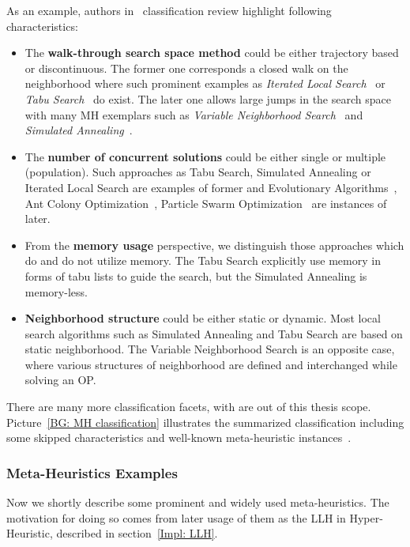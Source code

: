 As an example, authors in~\cite{birattari2001classification} classification review highlight following characteristics:
\begin{itemize}[itemsep=8pt]
	\item The \textbf{walk-through search space method} could be either trajectory based or discontinuous. The former one corresponds a closed walk on the neighborhood where such prominent examples as \textit{Iterated Local Search}~\cite{lourencco2003iterated} or \textit{Tabu Search}~\cite{glover1989tabu} do exist. The later one allows large jumps in the search space with many MH exemplars such as \textit{Variable Neighborhood Search}~\cite{hansen2003variable} and \textit{Simulated Annealing}~\cite{kirkpatrick1983optimization}.
	
	\item The \textbf{number of concurrent solutions} could be either single or multiple (population). Such approaches as Tabu Search, Simulated Annealing or Iterated Local Search are examples of former and Evolutionary Algorithms~\cite{eiben2015evolutionary}, Ant Colony Optimization~\cite{dorigo2007ant}, Particle Swarm Optimization~\cite{kennedy1995particle} are instances of later.
	
	\item From the \textbf{memory usage} perspective, we distinguish those approaches which do and do not utilize memory. The Tabu Search explicitly use memory in forms of tabu lists to guide the search, but the Simulated Annealing is memory-less.
	
	\item \textbf{Neighborhood structure} could be either static or dynamic. Most local search algorithms such as Simulated Annealing and Tabu Search are based on static neighborhood. The Variable Neighborhood Search is an opposite case, where various structures of neighborhood are defined and interchanged while solving an OP. 
\end{itemize}

There are many more classification facets, with are out of this thesis scope. Picture~\ref{BG: MH classification} illustrates the summarized classification including some skipped characteristics and well-known meta-heuristic instances~\cite{wiki_MH_classification}.


\subsubsection{Meta-Heuristics Examples}\label{BG: MH Examples}
Now we shortly describe some prominent and widely used meta-heuristics. The motivation for doing so comes from later usage of them as the LLH in Hyper-Heuristic, described in section~\ref{Impl: LLH}.

